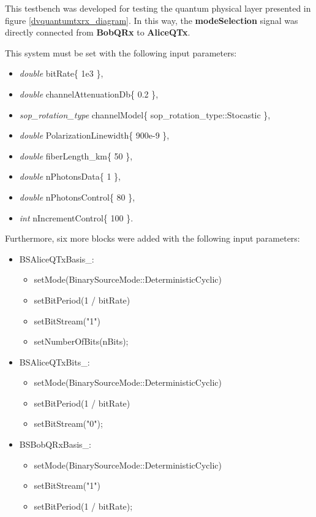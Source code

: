 \begin{refsection}
This testbench was developed for testing the quantum physical layer presented in figure \ref{dvquantumtxrx_diagram}. In this way, the \textbf{modeSelection} signal was directly connected from \textbf{BobQRx} to \textbf{AliceQTx}. 

This system must be set with the following input parameters:

\begin{itemize}
  \item \textit{double} bitRate\{ 1e3 \},
  \item \textit{double} channelAttenuationDb\{ 0.2 \},
  \item \textit{sop\_rotation\_type} channelModel\{ sop\_rotation\_type::Stocastic \},
  \item \textit{double} PolarizationLinewidth\{ 900e-9 \},
  \item \textit{double} fiberLength\_km\{ 50 \},
  \item \textit{double} nPhotonsData\{ 1 \},
  \item \textit{double} nPhotonsControl\{ 80 \},
  \item \textit{int} nIncrementControl\{ 100 \}.
\end{itemize}

Furthermore, six more blocks were added with the following input parameters:

\begin{itemize}
  \item BSAliceQTxBasis\_:
    \begin{itemize}
      \item setMode(BinarySourceMode::DeterministicCyclic)
      \item setBitPeriod(1 / bitRate)
      \item setBitStream("1")
      \item setNumberOfBits(nBits);
    \end{itemize}

  \item BSAliceQTxBits\_:
    \begin{itemize}
      \item setMode(BinarySourceMode::DeterministicCyclic)
      \item setBitPeriod(1 / bitRate)
      \item setBitStream("0");
    \end{itemize}
    
  \item BSBobQRxBasis\_:
    \begin{itemize}
      \item setMode(BinarySourceMode::DeterministicCyclic)
      \item setBitStream("1")
      \item setBitPeriod(1 / bitRate);
    \end{itemize}
    

\end{itemize}
\end{refsection}
